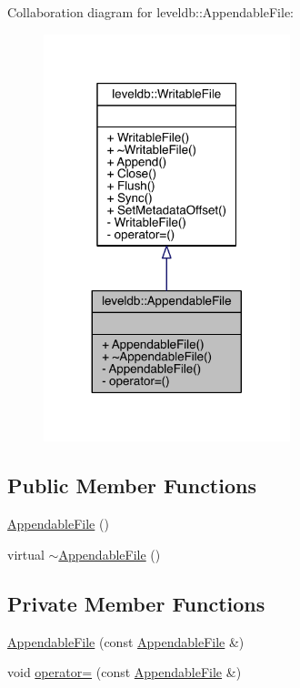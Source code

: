 Collaboration diagram for leveldb\+:\+:Appendable\+File\+:\nopagebreak
\begin{figure}[H]
\begin{center}
\leavevmode
\includegraphics[width=203pt]{classleveldb_1_1_appendable_file__coll__graph}
\end{center}
\end{figure}
\subsection*{Public Member Functions}
\begin{DoxyCompactItemize}
\item 
\hyperlink{classleveldb_1_1_appendable_file_ae219e5ae2133bcd585fd40785b2056ff}{Appendable\+File} ()
\item 
virtual \hyperlink{classleveldb_1_1_appendable_file_aa336a578de6791e1a34594176d77f538}{$\sim$\+Appendable\+File} ()
\end{DoxyCompactItemize}
\subsection*{Private Member Functions}
\begin{DoxyCompactItemize}
\item 
\hyperlink{classleveldb_1_1_appendable_file_a875e25604db40999b1cb6fe072c1f3f1}{Appendable\+File} (const \hyperlink{classleveldb_1_1_appendable_file}{Appendable\+File} \&)
\item 
void \hyperlink{classleveldb_1_1_appendable_file_a55d41a4117b69d2969f188048f196f21}{operator=} (const \hyperlink{classleveldb_1_1_appendable_file}{Appendable\+File} \&)
\end{DoxyCompactItemize}


